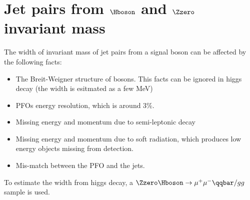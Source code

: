 \section{Jet pairs from $\Hboson$ and $\Zzero$ invariant mass }
The width of invariant mass of jet pairs from a signal boson can be affected by the following facts:
\begin{itemize}
\item The Breit-Weigner structure of bosons. This facts can be ignored in higgs decay (the width is esitmated as a few MeV) 
\item PFOs energy resolution, which is around 3\%.
\item Missing energy and momentum due to semi-leptonic decay
\item Missing energy and momentum due to soft radiation, which produces low energy objects missing from detection.
\item Mis-match between the PFO and the jets. 
\end{itemize}
To estimate the width from higgs decay, a $\Zzero\Hboson\to \mu^+\mu^- \qqbar/gg$ sample is used.
\clearpage